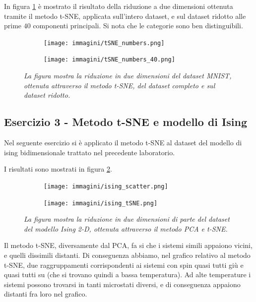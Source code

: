 \documentclass{article}
\begin{document}
In figura \ref{fig:tnse_numbers} è mostrato il risultato della riduzione a due dimensioni ottenuta tramite il metodo t-SNE, applicata sull'intero dataset, e sul dataset ridotto alle prime $40$ componenti principali. Si nota che le categorie sono ben distinguibili.
\begin{figure}[H]
    \centering
    \begin{subfigure}[b]{0.49\textwidth}
        \centering
        \texttt{[image: immagini/tSNE\_numbers.png]}
    \end{subfigure}
    \begin{subfigure}[b]{0.49\textwidth}
        \centering
        \texttt{[image: immagini/tSNE\_numbers\_40.png]}
    \end{subfigure}
    \caption{\emph{La figura mostra la riduzione in due dimensioni del dataset MNIST, ottenuta attraverso il metodo t-SNE, del dataset completo e sul dataset ridotto.}}
    \label{fig:tnse_numbers}
\end{figure}


\subsection*{Esercizio 3 - Metodo t-SNE e modello di Ising}
Nel seguente esercizio si è applicato il metodo t-SNE al dataset del modello di ising bidimensionale trattato nel precedente laboratorio.

I risultati sono mostrati in figura \ref{fig:ising}.
\begin{figure}[H]
    \centering
    \begin{subfigure}[b]{0.49\textwidth}
        \centering
        \texttt{[image: immagini/ising\_scatter.png]}
    \end{subfigure}
    \begin{subfigure}[b]{0.49\textwidth}
        \centering
        \texttt{[image: immagini/ising\_tSNE.png]}
    \end{subfigure}
    \caption{\emph{La figura mostra la riduzione in due dimensioni di parte del dataset del modello Ising 2-D, ottenuta attraverso il metodo PCA e t-SNE.}}
    \label{fig:ising}
\end{figure}

Il metodo t-SNE, diversamente dal PCA, fa si che i sistemi simili appaiono vicini, e quelli dissimili distanti.
Di conseguenza abbiamo, nel grafico relativo al metodo t-SNE, due raggruppamenti corrispondenti ai sistemi con spin quasi tutti giù e quasi tutti su (che si trovano quindi a bassa temperatura).
Ad alte temperature i sistemi possono trovarsi in tanti microstati diversi, e di conseguenza appaiono distanti fra loro nel grafico.
\end{document}
